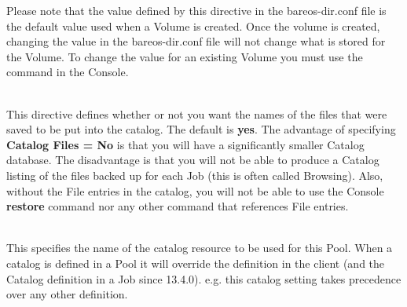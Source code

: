 \begin{description}
{Please note that the value defined by this directive in the  bareos-dir.conf
file is the default value used when a Volume  is created. Once the volume is
created, changing the value  in the bareos-dir.conf file will not change what
is stored  for the Volume. To change the value for an existing Volume  you
must use the
 command in the Console.
}

\item [Catalog Files = {\textless}yes{\textbar}no{\textgreater}] \hfill \\
This directive defines whether or not you want the names of the files
that were saved to be put into the catalog.  The default is {\bf yes}.
The advantage of specifying {\bf Catalog Files = No} is that you will
have a significantly smaller Catalog database.  The disadvantage is that
you will not be able to produce a Catalog listing of the files backed up
for each Job (this is often called Browsing).  Also, without the File
entries in the catalog, you will not be able to use the Console {\bf
restore} command nor any other command that references File entries.

\item [Catalog = {\textless}Catalog-resource-name{\textgreater}] \hfill \\
This specifies the name of the catalog resource to be used for this Pool.
When a catalog is defined in a Pool it will override the definition in
the client (and the Catalog definition in a Job since 13.4.0). e.g.
this catalog setting takes precedence over any other definition.



\end{description}
